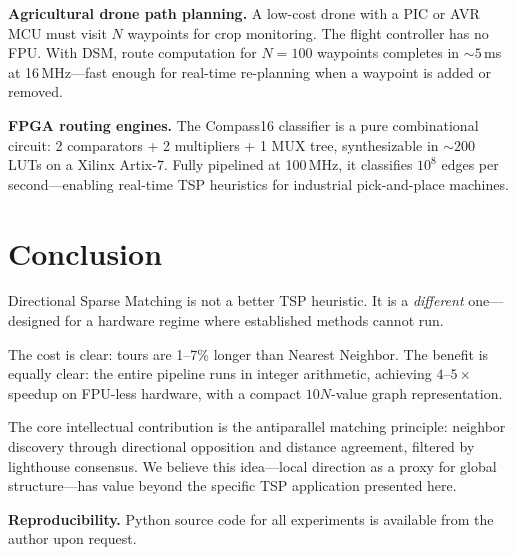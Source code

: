 \documentclass[11pt,a4paper,twocolumn]{article}
\begin{document}
\textbf{Agricultural drone path planning.} A low-cost drone with a PIC or AVR MCU must visit $N$ waypoints for crop monitoring. The flight controller has no FPU. With DSM, route computation for $N{=}100$ waypoints completes in ${\sim}5$\,ms at 16\,MHz---fast enough for real-time re-planning when a waypoint is added or removed.

\textbf{FPGA routing engines.} The Compass16 classifier is a pure combinational circuit: 2 comparators + 2 multipliers + 1 MUX tree, synthesizable in ${\sim}200$ LUTs on a Xilinx Artix-7. Fully pipelined at 100\,MHz, it classifies $10^8$ edges per second---enabling real-time TSP heuristics for industrial pick-and-place machines.

\FloatBarrier
\section{Conclusion}\label{sec:concl}

Directional Sparse Matching is not a better TSP heuristic. It is a \textit{different} one---designed for a hardware regime where established methods cannot run.

The cost is clear: tours are 1--7\% longer than Nearest Neighbor. The benefit is equally clear: the entire pipeline runs in integer arithmetic, achieving $4$--$5\times$ speedup on FPU-less hardware, with a compact $10N$-value graph representation.

The core intellectual contribution is the antiparallel matching principle: neighbor discovery through directional opposition and distance agreement, filtered by lighthouse consensus. We believe this idea---local direction as a proxy for global structure---has value beyond the specific TSP application presented here.

\smallskip
\noindent\textbf{Reproducibility.} Python source code for all experiments is available from the author upon request.
\end{document}
